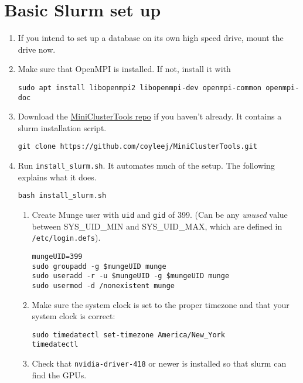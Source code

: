 \section{Basic Slurm set up} \label{sec:basicslurm}

\begin{enumerate}
\item If you intend to set up a database on its own high speed drive, mount the drive now. %

\item Make sure that OpenMPI is installed. If not, install it with

	\texttt{sudo apt install libopenmpi2 libopenmpi-dev openmpi-common openmpi-doc}

\item Download the \href{https://github.com/coyleej/MiniClusterTools}{MiniClusterTools repo}  if you haven't already. It contains a slurm installation script.

	\texttt{git clone https://github.com/coyleej/MiniClusterTools.git}

\item Run \texttt{install\_slurm.sh}. It automates much of the setup. The following explains what it does.

	\texttt{bash install\_slurm.sh}

	\begin{enumerate}
	\item Create Munge user with \texttt{uid} and \texttt{gid} of 399. (Can be any \emph{unused} value between SYS\_UID\_MIN and SYS\_UID\_MAX, which are defined in \texttt{/etc/login.defs}). 

		\texttt{mungeUID=399} \\
		\texttt{sudo groupadd -g \$mungeUID munge} \\
		\texttt{sudo useradd -r -u \$mungeUID -g \$mungeUID munge} \\
		\texttt{sudo usermod -d /nonexistent munge}

	\item Make sure the system clock is set to the proper timezone and that your system clock is correct:

		\texttt{sudo timedatectl set-timezone America/New\_York} \\
		\texttt{timedatectl}

	\item Check that \texttt{nvidia-driver-418} or newer is installed so that slurm can find the GPUs.


\end{enumerate}
\end{enumerate}
